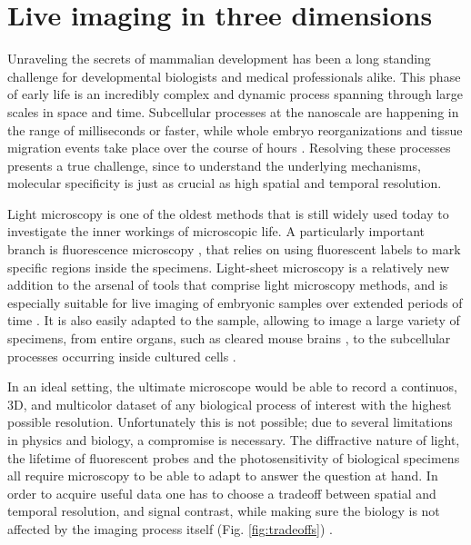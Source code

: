 

\chapter{Live imaging in three dimensions}

\graphicspath{{./figures/1_spim/}}

Unraveling the secrets of mammalian development has been a long standing challenge for developmental biologists and medical professionals alike. 
This phase of early life is an incredibly complex and dynamic process spanning through large scales in space and time. Subcellular processes at the nanoscale are happening in the range of milliseconds or faster, while whole embryo reorganizations and tissue migration events take place over the course of hours \cite{gilbert_developmental_2013}. Resolving these processes presents a true challenge, since to understand the underlying mechanisms, molecular specificity is just as crucial as high spatial and temporal resolution.

Light microscopy is one of the oldest methods that is still widely used today to investigate the inner workings of microscopic life. A particularly important branch is fluorescence microscopy \cite{diaspro_optical_2011}, that relies on using fluorescent labels to mark specific regions inside the specimens. Light-sheet microscopy is a relatively new addition to the arsenal of tools that comprise light microscopy methods, and is especially suitable for live imaging of embryonic samples over extended periods of time \cite{keller_quantitative_2008, huisken_selective_2009, weber_light_2011,tomer_shedding_2011}. It is also easily adapted to the sample, allowing to image a large variety of specimens, from entire organs, such as cleared mouse brains \cite{dodt_ultramicroscopy:_2007}, to the subcellular processes occurring inside cultured cells \cite{chen_lattice_2014}.

In an ideal setting, the ultimate microscope would be able to record a continuos, 3D, and multicolor dataset of any biological process of interest with the highest possible resolution. Unfortunately this is not possible; due to several limitations in physics and biology, a compromise is necessary. The diffractive nature of light, the lifetime of fluorescent probes and the photosensitivity of biological specimens all require microscopy to be able to adapt to answer the question at hand. In order to acquire useful data one has to choose a tradeoff between spatial and temporal resolution, and signal contrast, while making sure the biology is not affected by the imaging process itself (Fig. \ref{fig:tradeoffs}) \cite{laissue_assessing_2017}. 

